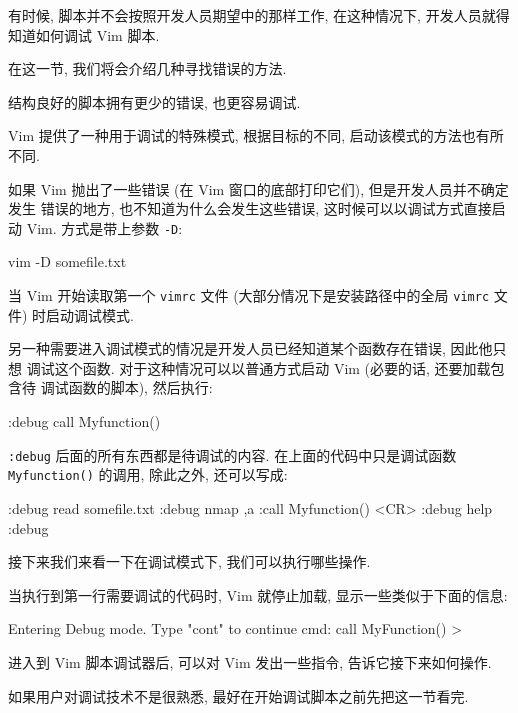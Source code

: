 有时候, 脚本并不会按照开发人员期望中的那样工作, 在这种情况下, 开发人员就得
知道如何调试 Vim 脚本.

在这一节, 我们将会介绍几种寻找错误的方法.

\begin{warning}
    结构良好的脚本拥有更少的错误, 也更容易调试.
\end{warning}

Vim 提供了一种用于调试的特殊模式, 根据目标的不同, 启动该模式的方法也有所不同.

如果 Vim 抛出了一些错误 (在 Vim 窗口的底部打印它们), 但是开发人员并不确定发生
错误的地方, 也不知道为什么会发生这些错误, 这时候可以以调试方式直接启动 Vim.
方式是带上参数 \texttt{-D}:
\begin{vimcode}
vim -D somefile.txt
\end{vimcode}
当 Vim 开始读取第一个 \texttt{vimrc} 文件 (大部分情况下是安装路径中的全局
\texttt{vimrc} 文件) 时启动调试模式.

另一种需要进入调试模式的情况是开发人员已经知道某个函数存在错误, 因此他只想
调试这个函数. 对于这种情况可以以普通方式启动 Vim (必要的话, 还要加载包含待
调试函数的脚本), 然后执行:
\begin{vimcode}
:debug call Myfunction()
\end{vimcode}
\texttt{:debug} 后面的所有东西都是待调试的内容. 在上面的代码中只是调试函数
\texttt{Myfunction()} 的调用, 除此之外, 还可以写成:
\begin{vimcode}
:debug read somefile.txt
:debug nmap ,a :call Myfunction() <CR>
:debug help :debug
\end{vimcode}

接下来我们来看一下在调试模式下, 我们可以执行哪些操作.

当执行到第一行需要调试的代码时, Vim 就停止加载, 显示一些类似于下面的信息:
\begin{vimcode}
Entering Debug mode. Type "cont" to continue
cmd: call MyFunction()
>
\end{vimcode}
进入到 Vim 脚本调试器后, 可以对 Vim 发出一些指令, 告诉它接下来如何操作.
\begin{warning}
    如果用户对调试技术不是很熟悉, 最好在开始调试脚本之前先把这一节看完.
\end{warning}

